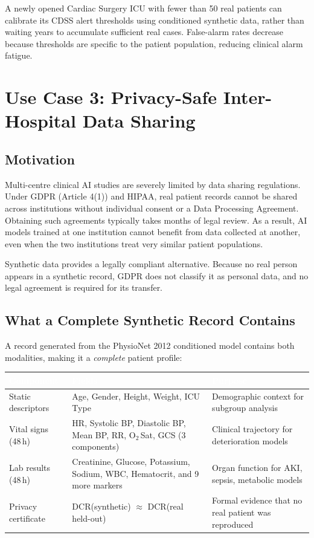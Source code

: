 \documentclass[12pt, a4paper]{article}
\begin{document}
A newly opened Cardiac Surgery ICU with fewer than 50 real patients can
calibrate its CDSS alert thresholds using conditioned synthetic data,
rather than waiting years to accumulate sufficient real cases. False-alarm
rates decrease because thresholds are specific to the patient population,
reducing clinical alarm fatigue.

\section{Use Case 3: Privacy-Safe Inter-Hospital Data Sharing}

\subsection{Motivation}

Multi-centre clinical AI studies are severely limited by data sharing
regulations. Under GDPR (Article 4(1)) and HIPAA, real patient records
cannot be shared across institutions without individual consent or a
Data Processing Agreement. Obtaining such agreements typically takes
months of legal review. As a result, AI models trained at one institution
cannot benefit from data collected at another, even when the two institutions
treat very similar patient populations.

Synthetic data provides a legally compliant alternative. Because no real
person appears in a synthetic record, GDPR does not classify it as personal
data, and no legal agreement is required for its transfer.

\subsection{What a Complete Synthetic Record Contains}

A record generated from the PhysioNet 2012 conditioned model contains
both modalities, making it a \textit{complete} patient profile:

\begin{table}[H]
\centering
\renewcommand{\arraystretch}{1.4}
\begin{tabularx}{\linewidth}{L{3cm} L{5.5cm} X}
\toprule
{}
\textcolor{white}{\textbf{Component}} &
\textcolor{white}{\textbf{Fields}} &
\textcolor{white}{\textbf{Purpose}} \\
\midrule
{}
Static descriptors &
Age, Gender, Height, Weight, ICU Type &
Demographic context for subgroup analysis \\
Vital signs (48\,h) &
HR, Systolic BP, Diastolic BP, Mean BP,
RR, O$_2$\,Sat, GCS (3 components) &
Clinical trajectory for deterioration models \\
Lab results (48\,h) &
Creatinine, Glucose, Potassium, Sodium,
WBC, Hematocrit, and 9 more markers &
Organ function for AKI, sepsis, metabolic models \\
Privacy certificate &
DCR(synthetic) $\approx$ DCR(real held-out) &
Formal evidence that no real patient was reproduced \\
\bottomrule
\end{tabularx}
\end{table}
\end{document}

